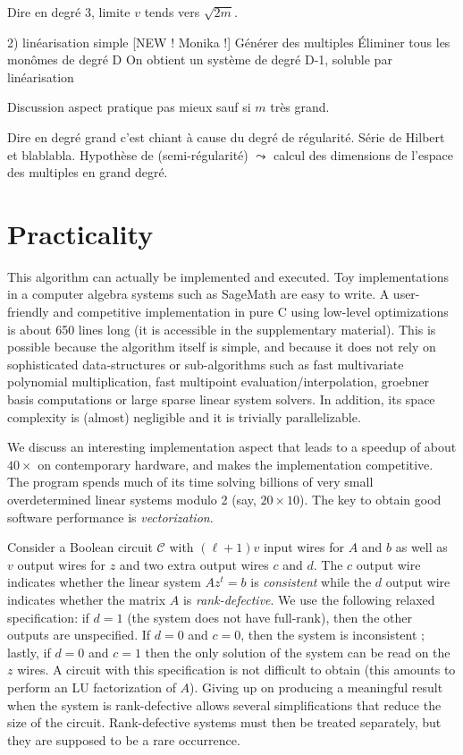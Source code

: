 \documentclass[a4paper,UKenglish,cleveref, autoref]{lipics-v2019}
\begin{document}
Dire en degré 3, limite $v$ tends vers $\sqrt{2m}$.

2) linéarisation simple [NEW ! Monika !]
Générer des multiples
Éliminer tous les monômes de degré D
On obtient un système de degré D-1, soluble par linéarisation

Discussion aspect pratique pas mieux sauf si $m$ très grand.


Dire en degré grand c'est chiant à cause du degré de régularité. Série de Hilbert et blablabla. Hypothèse de (semi-régularité) $\leadsto$ calcul des dimensions de l'espace des multiples en grand degré.



\section{Practicality}

This algorithm can actually be implemented and executed. Toy implementations in
a computer algebra systems such as \textsf{SageMath} are easy to write. A
user-friendly and competitive implementation in pure C using low-level
optimizations is about 650 lines long (it is accessible in the supplementary
material). This is possible because the algorithm itself is simple, and because
it does not rely on sophisticated data-structures or sub-algorithms such as fast
multivariate polynomial multiplication, fast multipoint
evaluation/interpolation, groebner basis computations or large sparse linear
system solvers. In addition, its space complexity is (almost) negligible and it
is trivially parallelizable.

We discuss an interesting implementation aspect that leads to a speedup of about
$40 \times$ on contemporary hardware, and makes the implementation
competitive. The program spends much of its time solving billions of very small
overdetermined linear systems modulo 2 (say, $20 \times 10$). The key to obtain
good software performance is \emph{vectorization}.

Consider a Boolean circuit $\mathcal{C}$ with $(\ell+1)v$ input wires for $A$
and $b$ as well as $v$ output wires for $z$ and two extra output wires $c$ and
$d$. The $c$ output wire indicates whether the linear system $A z^t = b$ is
\emph{consistent} while the $d$ output wire indicates whether the matrix $A$ is
\emph{rank-defective}. We use the following relaxed specification: if $d=1$ (the
system does not have full-rank), then the other outputs are unspecified. If
$d=0$ and $c=0$, then the system is inconsistent ; lastly, if $d=0$ and $c=1$
then the only solution of the system can be read on the $z$ wires. A circuit
with this specification is not difficult to obtain (this amounts to perform an
LU factorization of $A$). Giving up on producing a meaningful result when the
system is rank-defective allows several simplifications that reduce the size of
the circuit. Rank-defective systems must then be treated separately, but they
are supposed to be a rare occurrence.
\end{document}

